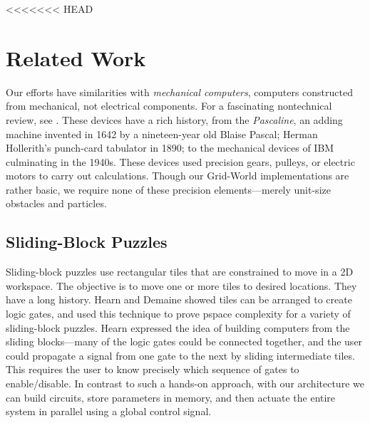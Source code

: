 <<<<<<< HEAD
\section{Related Work}\label{sec:RelatedWork}
Our efforts have similarities with \emph{mechanical computers},  computers
constructed from mechanical, not electrical components. For a fascinating
nontechnical review, see \cite{McCourtney1999}.  These devices have a rich
history, from the \emph{Pascaline}, an adding machine invented in 1642 by a
nineteen-year old Blaise Pascal; Herman Hollerith's punch-card tabulator in
1890; to the mechanical devices of IBM culminating in the 1940s.  These devices
used precision gears, pulleys, or electric motors to carry out calculations.
Though our {\sc Grid-World} implementations are rather basic, 
we require none of these precision elements---merely unit-size obstacles and particles.

\subsection{Sliding-Block Puzzles}
Sliding-block puzzles use rectangular tiles that are constrained to move in a 2D workspace. The objective is to move one or more tiles to desired locations. They have a long history.
Hearn \cite{hearn2005complexity} and Demaine \cite{Demaine2009} showed tiles can be arranged to create logic gates, and used this technique to prove {\sc pspace} complexity for a variety of sliding-block puzzles.  Hearn expressed the idea of building computers from the sliding blocks---many of the logic gates could be connected together, and the user could propagate a signal from one gate to the next by sliding intermediate tiles.  This requires the user to know precisely which sequence of gates to enable/disable.  In contrast to such a hands-on approach, with our architecture we can build circuits, store parameters in memory, and then actuate the entire system in parallel using a global control signal.

